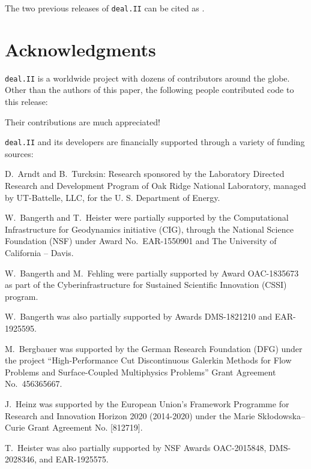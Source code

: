 \documentclass{ansarticle-preprint}
\newcommand{\specialword}[1]{\texttt{#1}}
\newcommand{\dealii}{{\specialword{deal.II}}\xspace}
\begin{document}
The two previous releases of \dealii can be cited as
\cite{dealII92,dealII93}.


\section{Acknowledgments}

\dealii is a worldwide project with dozens of contributors around the
globe. Other than the authors of this paper, the following people
contributed code to this release:\\
%
%




Their contributions are much appreciated!


\bigskip

\dealii and its developers are financially supported through a
variety of funding sources:

D.~Arndt and B.~Turcksin: Research sponsored by the Laboratory Directed Research and
Development Program of Oak Ridge National Laboratory, managed by UT-Battelle,
LLC, for the U. S. Department of Energy.

W.~Bangerth and T.~Heister were partially
supported by the Computational Infrastructure for Geodynamics initiative
(CIG), through the National Science Foundation (NSF) under Award
No.~EAR-1550901 and The University of California -- Davis.

W.~Bangerth and M.~Fehling were partially supported by Award OAC-1835673
as part of the Cyberinfrastructure for Sustained Scientific Innovation (CSSI)
program.

W.~Bangerth was also partially supported by Awards DMS-1821210 and EAR-1925595.

M.~Bergbauer was supported by the German Research Foundation (DFG) under the
project ``High-Performance Cut Discontinuous Galerkin Methods for Flow
Problems and Surface-Coupled Multiphysics Problems'' Grant Agreement
No.~456365667.


J.~Heinz was supported by the European Union’s Framework Programme for Research
and Innovation Horizon 2020 (2014-2020) under the Marie Sk\l{}odowska--Curie Grant
Agreement No. [812719].

T.~Heister was also partially supported by NSF
Awards OAC-2015848, DMS-2028346, and
EAR-1925575.
\end{document}
